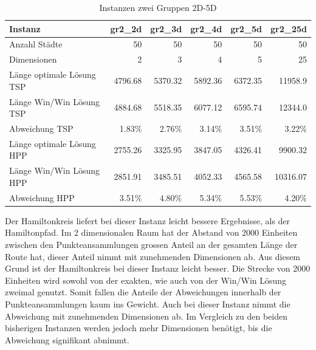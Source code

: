\documentclass[11pt,a4paper]{article}
\begin{document}
\begin{table}[H]
        \centering
        \begin{tabular}{| l | r | r | r | r | r |}
            \hline
            Instanz                     & \textbf{gr2\_2d}     
                                        & \textbf{gr2\_3d}     
                                        & \textbf{gr2\_4d}     
                                        & \textbf{gr2\_5d}     
                                        & \textbf{gr2\_25d}             \\ \hline
                Anzahl Städte               & 50        & 50       & 50         & 50        & 50        \\ \hline
                Dimensionen                 & 2         & 3        & 4          & 5         & 25        \\ \hline
                Länge optimale Lösung TSP   & 4796.68   & 5370.32  & 5892.36    & 6372.35   & 11958.9   \\ \hline
                Länge Win/Win Lösung  TSP   & 4884.68   & 5518.35  & 6077.12    & 6595.74   & 12344.0   \\ \hline
                Abweichung TSP              &  1.83\%   &  2.76\%  &  3.14\%    &  3.51\%   & 3.22\%    \\ \hline
                Länge optimale Lösung HPP   & 2755.26   & 3325.95  & 3847.05    & 4326.41   & 9900.32   \\ \hline
                Länge Win/Win Lösung  HPP   & 2851.91   & 3485.51  & 4052.33    & 4565.58   & 10316.07  \\ \hline
                Abweichung HPP              &  3.51\%   &  4.80\%  &  5.34\%    &  5.53\%   & 4.20\%    \\ \hline
        \end{tabular}
        \caption{Instanzen zwei Gruppen 2D-5D}
        \label{tab:instanzen_crowds2}
\end{table}

Der Hamiltonkreis liefert bei dieser Instanz leicht bessere Ergebnisse, als der Hamiltonpfad. Im 2 dimensionalen Raum hat der Abstand von 2000 Einheiten zwischen den Punkteansammlungen  grossen Anteil an der gesamten Länge der Route hat, dieser Anteil nimmt mit zunehmenden Dimensionen ab. Aus diesem Grund ist der Hamiltonkreis bei dieser Instanz leicht besser. Die Strecke von 2000 Einheiten wird sowohl von der exakten, wie auch von der Win/Win Lösung zweimal genutzt. Somit fallen die Anteile der Abweichungen innerhalb der Punkteansammlungen kaum ins Gewicht.
Auch bei dieser Instanz nimmt die Abweichung mit zunehmenden Dimensionen ab. Im Vergleich zu den beiden bisherigen Instanzen werden jedoch mehr Dimensionen benötigt, bis die Abweichung signifikant abnimmt.
\end{document}

